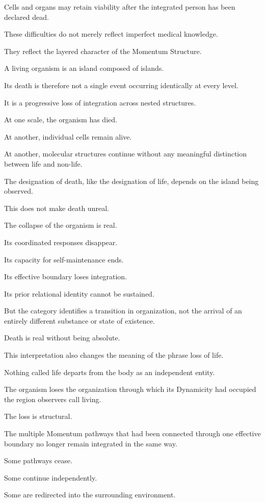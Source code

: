 Cells and organs may retain viability after the integrated person has been declared dead.

These difficulties do not merely reflect imperfect medical knowledge.

They reflect the layered character of the Momentum Structure.

A living organism is an island composed of islands.

Its death is therefore not a single event occurring identically at every level.

It is a progressive loss of integration across nested structures.

At one scale, the organism has died.

At another, individual cells remain alive.

At another, molecular structures continue without any meaningful distinction between life and non-life.

The designation of death, like the designation of life, depends on the island being observed.

This does not make death unreal.

The collapse of the organism is real.

Its coordinated responses disappear.

Its capacity for self-maintenance ends.

Its effective boundary loses integration.

Its prior relational identity cannot be sustained.

But the category identifies a transition in organization, not the arrival of an entirely different substance or state of existence.

Death is real without being absolute.

This interpretation also changes the meaning of the phrase loss of life.

Nothing called life departs from the body as an independent entity.

The organism loses the organization through which its Dynamicity had occupied the region observers call living.

The loss is structural.

The multiple Momentum pathways that had been connected through one effective boundary no longer remain integrated in the same way.

Some pathways cease.

Some continue independently.

Some are redirected into the surrounding environment.

